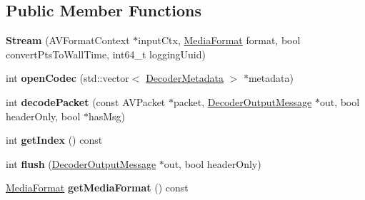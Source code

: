 \subsection*{Public Member Functions}
\begin{DoxyCompactItemize}
\item 
\mbox{\label{classffmpeg_1_1Stream_a09af2f092037daeef7fa1d95ca8cda20}} 
{\bfseries Stream} (A\+V\+Format\+Context $\ast$input\+Ctx, \hyperlink{structffmpeg_1_1MediaFormat}{Media\+Format} format, bool convert\+Pts\+To\+Wall\+Time, int64\+\_\+t logging\+Uuid)
\item 
\mbox{\label{classffmpeg_1_1Stream_af06d3cb14886c7043912644bc45b4239}} 
int {\bfseries open\+Codec} (std\+::vector$<$ \hyperlink{structffmpeg_1_1DecoderMetadata}{Decoder\+Metadata} $>$ $\ast$metadata)
\item 
\mbox{\label{classffmpeg_1_1Stream_afce3ade2918317c6f08447e57f9a02a0}} 
int {\bfseries decode\+Packet} (const A\+V\+Packet $\ast$packet, \hyperlink{structffmpeg_1_1DecoderOutputMessage}{Decoder\+Output\+Message} $\ast$out, bool header\+Only, bool $\ast$has\+Msg)
\item 
\mbox{\label{classffmpeg_1_1Stream_a148ac1d4ae8c7ad1926391d76142d9a4}} 
int {\bfseries get\+Index} () const
\item 
\mbox{\label{classffmpeg_1_1Stream_adb704df8dc09512bfb8bd5e684be086f}} 
int {\bfseries flush} (\hyperlink{structffmpeg_1_1DecoderOutputMessage}{Decoder\+Output\+Message} $\ast$out, bool header\+Only)
\item 
\mbox{\label{classffmpeg_1_1Stream_abc0b3d2bb0e979c8318fccb28c2abdbc}} 
\hyperlink{structffmpeg_1_1MediaFormat}{Media\+Format} {\bfseries get\+Media\+Format} () const
\end{DoxyCompactItemize}
